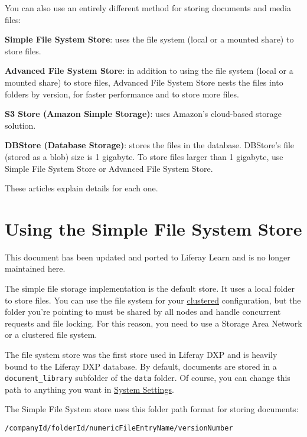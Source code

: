 You can also use an entirely different method for storing documents and
media files:

\textbf{Simple File System Store}: uses the file system (local or a
mounted share) to store files.

\textbf{Advanced File System Store}: in addition to using the file
system (local or a mounted share) to store files, Advanced File System
Store nests the files into folders by version, for faster performance
and to store more files.

\textbf{S3 Store (Amazon Simple Storage)}: uses Amazon's cloud-based
storage solution.

\textbf{DBStore (Database Storage)}: stores the files in the database.
DBStore's file (stored as a blob) size is 1 gigabyte. To store files
larger than 1 gigabyte, use Simple File System Store or Advanced File
System Store.

These articles explain details for each one.

\chapter{Using the Simple File System
Store}\label{using-the-simple-file-system-store}

{This document has been updated and ported to Liferay Learn and is no
longer maintained here.}

The simple file storage implementation is the default store. It uses a
local folder to store files. You can use the file system for your
\href{/docs/7-2/deploy/-/knowledge_base/d/liferay-clustering}{clustered}
configuration, but the folder you're pointing to must be shared by all
nodes and handle concurrent requests and file locking. For this reason,
you need to use a Storage Area Network or a clustered file system.

The file system store was the first store used in Liferay DXP and is
heavily bound to the Liferay DXP database. By default, documents are
stored in a \texttt{document\_library} subfolder of the \texttt{data}
folder. Of course, you can change this path to anything you want in
\href{/docs/7-2/user/-/knowledge_base/u/system-settings}{System
Settings}.

The Simple File System store uses this folder path format for storing
documents:

\begin{verbatim}
/companyId/folderId/numericFileEntryName/versionNumber
\end{verbatim}

